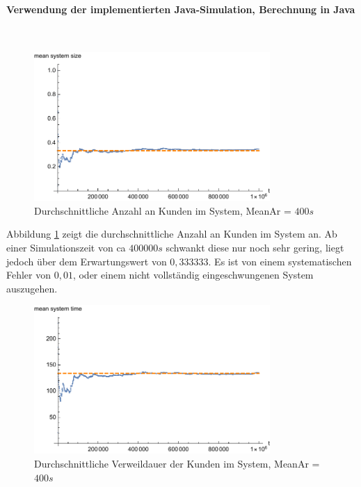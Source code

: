 \paragraph{Verwendung der implementierten Java-Simulation, Berechnung in Java}
\\
\begin{figure}[htpb]
	\centering
	\includegraphics[width=0.8\textwidth]{abbildungen/1_Phone/Arrival_400_Serve_100_dur_1000000_Skip_0/MeanSystemSize.pdf}
	\caption{Durchschnittliche Anzahl an Kunden im System, MeanAr = $400s$}
	\label{fig:meanSystemSize400}
\end{figure}

Abbildung \ref{fig:meanSystemSize400} zeigt die durchschnittliche Anzahl an Kunden im System an. Ab einer Simulationszeit von ca $400000s$ schwankt diese nur noch sehr gering, liegt jedoch über dem Erwartungswert von $0,333333$. Es ist von einem systematischen Fehler von $0,01$, oder einem nicht vollständig eingeschwungenen System auszugehen.

\begin{figure}[htpb]
	\centering
	\includegraphics[width=0.8\textwidth]{abbildungen/1_Phone/Arrival_400_Serve_100_dur_1000000_Skip_0/MeanSystemTime.pdf}
	\caption{Durchschnittliche Verweildauer der Kunden im System, MeanAr = $400s$}
	\label{fig:meanSystemTime400}
\end{figure}

